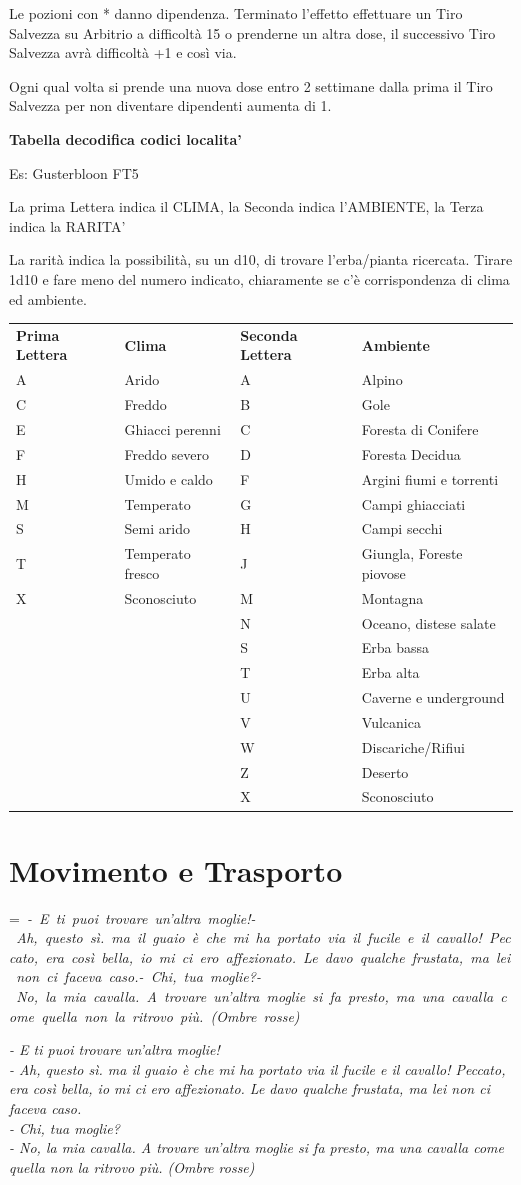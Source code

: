 \documentclass[a4paper,11pt,twoside,openany]{book}
\makeatletter
\newcommand{\mybox}[1]{%
	\setbox0=\hbox{#1}%
	\setlength{\@tempdima}{\dimexpr\wd0+13pt}%
	\begin{tcolorbox}[boxrule=0.5pt,arc=4pt, breakable,enhanced,
		left=6pt,right=6pt,top=6pt,bottom=6pt,boxsep=0pt,width=\@tempdima]
		#1
	\end{tcolorbox}
}
\makeatother
\begin{document}
{\medskip

Le pozioni con {*} danno dipendenza. Terminato l'effetto effettuare
un Tiro Salvezza su Arbitrio a difficoltà 15 o prenderne un altra
dose, il successivo Tiro Salvezza avrà difficoltà +1 e così via.

Ogni qual volta si prende una nuova dose entro 2 settimane dalla prima il Tiro Salvezza per non diventare dipendenti aumenta di 1.

\bigskip

\textbf{Tabella decodifica codici localita'}
\smallskip

Es: Gusterbloon FT5

La prima Lettera indica il CLIMA, la Seconda indica l'AMBIENTE, la
Terza indica la RARITA'

La rarità indica la possibilità, su un d10, di trovare l'erba/pianta
ricercata. Tirare 1d10 e fare meno del numero indicato, chiaramente
se c'è corrispondenza di clima ed ambiente.
\bigskip

\begin{tabular}{llll}
\toprule
\textbf{Prima Lettera} & \textbf{Clima}&\textbf{Seconda Lettera} & \textbf{Ambiente}\tabularnewline
A & Arido & A & Alpino\tabularnewline
C & Freddo&B & Gole\tabularnewline
E & Ghiacci perenni&C & Foresta di Conifere\tabularnewline
F & Freddo severo&D & Foresta Decidua\tabularnewline
H & Umido e caldo&F & Argini fiumi e torrenti\tabularnewline
M & Temperato&G & Campi ghiacciati\tabularnewline
S & Semi arido&H & Campi secchi\tabularnewline
T & Temperato fresco&J & Giungla, Foreste piovose\tabularnewline
X & Sconosciuto&M & Montagna\tabularnewline
&&N & Oceano, distese salate\tabularnewline
&&S & Erba bassa\tabularnewline
&&T & Erba alta\tabularnewline
&&U & Caverne e underground\tabularnewline
&&V & Vulcanica\tabularnewline
&&W & Discariche/Rifiui\tabularnewline
&&Z & Deserto\tabularnewline
&&X & Sconosciuto\tabularnewline
\end{tabular}

\pagebreak

\section{Movimento e Trasporto}

\label{movimento-e-trasporto}



\mybox{\textit{
- E ti puoi trovare un'altra moglie!\\
- Ah, questo sì. ma il guaio è che mi ha portato via il fucile e il cavallo! Peccato, era così bella, io mi ci ero affezionato. Le davo qualche frustata, ma lei non ci faceva caso.\\
- Chi, tua moglie?\\
- No, la mia cavalla. A trovare un'altra moglie si fa presto, ma una cavalla come quella non la ritrovo più. (Ombre rosse)
}}\medskip


}
\end{document}
